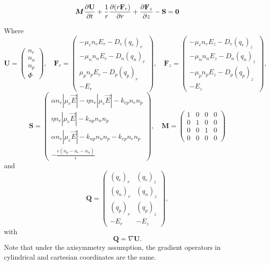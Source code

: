 \documentclass[12pt, a4paper]{report}
\begin{document}
\begin{center}
\[
{\bm M} \frac{\partial {\bf U}}{\partial t} +  \frac{1}{r} \frac{\partial (r {\bf F}_r)}{\partial r} +  \frac{\partial {\bf F}_z}{\partial z} -  {\bf S}  = {\bf 0}
\]
\end{center}
Where
\begin{equation} 
{\bm U} = \left( \begin{array}{c} n_e \\ n_n \\ n_p \\ \Phi \end{array} \right),  \quad {\bm F}_r = \left( \begin{array}{c} - \mu_e n_e E_r - D_e (q_e)_r \\ -\mu_n n_n E_r - D_n (q_n)_r \\ \mu_p n_p E_r - D_p (q_p)_r \\ -E_r \end{array} \right),  \quad {\bm F}_z = \left( \begin{array}{c} - \mu_e n_e E_z - D_e (q_e)_z \\ -\mu_n n_n E_z - D_n (q_n)_z \\ -\mu_p n_p E_z - D_p (q_p)_z \\ -E_z \end{array} \right),
\end{equation}
\begin{equation} 
{\bm S} = \left( \begin{array}{c} \alpha n_e|\mu_e\vec{E}| -\eta n_e|\mu_e\vec{E}| - k_{ep}n_en_p \\ \eta n_e|\mu_e\vec{E}| - k_{np}n_nn_p \\ \alpha n_e|\mu_e\vec{E}| - k_{np}n_nn_p - k_{ep}n_en_p \\-\frac{e(n_p-n_e-n_n)}{\epsilon} \end{array} \right),  \quad {\bm M} = \left( \begin{array}{cccc} 
1 & 0 & 0 & 0 \\
0 & 1 & 0 & 0 \\
0 & 0 & 1 & 0 \\
0 & 0 & 0 & 0 \end{array} \right)
\end{equation}
and
\begin{equation} 
{\bm Q} = \left( \begin{array}{cc} (q_e)_r & (q_e)_z  \\ (q_n)_r & (q_n)_z \\ (q_p)_r & (q_p)_z\\ -E_r & -E_z \end{array} \right),  
\end{equation}
with 
\begin{equation} 
{\bm Q} = \nabla {\bm U}.
\end{equation}
Note that under the  axisymmetry assumption, the gradient operators in cylindrical and cartesian coordinates are the same.
\end{document}
